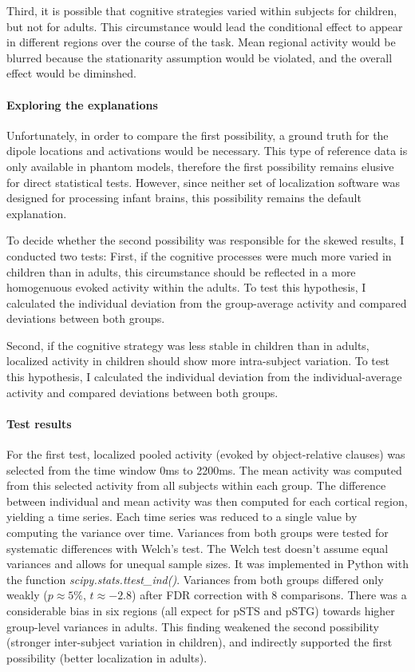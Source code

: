 Third, it is possible that cognitive strategies varied within subjects for children, but not for adults.
This circumstance would lead the conditional effect to appear in different regions over the course of the task.
Mean regional activity would be blurred because the stationarity assumption would be violated, and the overall effect would be diminshed.

\paragraph{Exploring the explanations}
Unfortunately, in order to compare the first possibility, a ground truth for the dipole locations and activations would be necessary.
This type of reference data is only available in phantom models, therefore the first possibility remains elusive for direct statistical tests.
However, since neither set of localization software was designed for processing infant brains, this possibility remains the  default explanation.

To decide whether the second possibility was responsible for the skewed results, I conducted two tests:
First, if the cognitive processes were much more varied in children than in adults, this circumstance should be reflected in a more homogenuous evoked activity within the adults.
To test this hypothesis, I calculated the individual deviation from the group-average activity and compared deviations between both groups.

Second, if the cognitive strategy was less stable in children than in adults, localized activity in children should show more intra-subject variation.
To test this hypothesis, I calculated the individual deviation from the individual-average activity and compared deviations between both groups.

\paragraph{Test results}
For the first test, localized pooled activity (evoked by object-relative clauses) was selected from the time window 0ms to 2200ms.
The mean activity was computed from this selected activity from all subjects within each group.
The difference between individual and mean activity was then computed for each cortical region, yielding a time series.
Each time series was reduced to a single value by computing the variance over time.
Variances from both groups were tested for systematic differences with Welch's test.
The Welch test doesn't assume equal variances and allows for unequal sample sizes.
It was implemented in Python with the function \emph{scipy.stats.ttest\_ind()}.
Variances from both groups differed only weakly ($p \approx 5\%$, $t \approx -2.8$) after FDR correction with 8 comparisons.
There was a considerable bias in six regions (all expect for pSTS and pSTG) towards higher group-level variances in adults.
This finding weakened the second possibility (stronger inter-subject variation in children), and indirectly supported the first possibility (better localization in adults).

